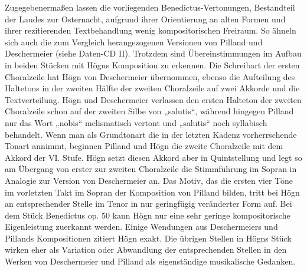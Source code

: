 \documentclass[a4paper]{article}
\begin{document}
Zugegebenermaßen lassen die vorliegenden Benedictus-Vertonungen,
Bestandteil der Laudes zur Osternacht, aufgrund ihrer Orientierung an
alten Formen und ihrer rezitierenden Textbehandlung wenig
kompositorischen Freiraum. So ähneln sich auch die zum Vergleich
herangezogenen Versionen von Pilland und Deschermeier (siehe Daten-CD
II). Trotzdem sind Übereinstimmungen im Aufbau in beiden Stücken mit
Högns Komposition zu erkennen. Die Schreibart der ersten Choralzeile
hat Högn von Deschermeier übernommen, ebenso die Aufteilung des
Haltetons in der zweiten Hälfte der zweiten Choralzeile auf zwei
Akkorde und die Textverteilung. Högn und Deschermeier verlassen den
ersten Halteton der zweiten Choralzeile schon auf der zweiten Silbe von
„salutis“, während hingegen Pilland nur das Wort „nobis“ melismatisch
vertont und „salutis“ noch syllabisch behandelt. Wenn man als
Grundtonart die in der letzten Kadenz vorherrschende Tonart annimmt,
beginnen Pilland und Högn die zweite Choralzeile mit dem Akkord der VI.
Stufe. Högn setzt diesen Akkord aber in Quintstellung und legt so am
Übergang von erster zur zweiten Choralzeile die Stimmführung im Sopran
in Analogie zur Version von Deschermeier an. Das Motiv, das die ersten
vier Töne im vorletzten Takt im Sopran der Komposition von Pilland
bilden, tritt bei Högn an entsprechender Stelle im Tenor in nur
geringfügig veränderter Form auf. Bei dem Stück Benedictus op. 50 kann
Högn nur eine sehr geringe kompositorische Eigenleistung zuerkannt
werden. Einige Wendungen aus Deschermeiers und Pillands Kompositionen
zitiert Högn exakt. Die übrigen Stellen in Högns Stück wirken eher als
Variation oder Abwandlung der entsprechenden Stellen in den Werken von
Deschermeier und Pilland als eigenständige musikalische Gedanken.
\end{document}
